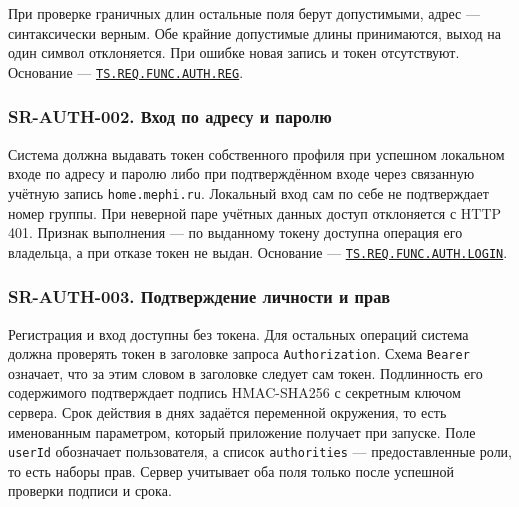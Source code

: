 \documentclass[12pt,a4paper]{article}
\begin{document}
При проверке граничных длин остальные поля берут допустимыми, адрес --- синтаксически верным. Обе крайние допустимые длины принимаются, выход на один символ отклоняется. При ошибке новая запись и токен отсутствуют. Основание --- {\href{../02\_Техническое\_задание/DOC-02\_Техническое\_задание.pdf\#ts-req-func-auth-reg}{\texttt{TS.\allowbreak{}REQ.\allowbreak{}FUNC.\allowbreak{}AUTH.\allowbreak{}REG}}}.

\subsubsection{SR-AUTH-002. Вход по адресу и паролю}\label{sr-auth-002-ux432ux445ux43eux434-ux43fux43e-ux430ux434ux440ux435ux441ux443-ux438-ux43fux430ux440ux43eux43bux44e}

\hypertarget{sr-auth-002-вход-по-адресу-и-паролю}{}

\hypertarget{sr-auth-002}{}

Система должна выдавать токен собственного профиля при успешном локальном входе по адресу и паролю либо при подтверждённом входе через связанную учётную запись \texttt{home.\allowbreak{}mephi.\allowbreak{}ru}. Локальный вход сам по себе не подтверждает номер группы. При неверной паре учётных данных доступ отклоняется с HTTP 401. Признак выполнения --- по выданному токену доступна операция его владельца, а при отказе токен не выдан. Основание --- {\href{../02\_Техническое\_задание/DOC-02\_Техническое\_задание.pdf\#ts-req-func-auth-login}{\texttt{TS.\allowbreak{}REQ.\allowbreak{}FUNC.\allowbreak{}AUTH.\allowbreak{}LOGIN}}}.

\subsubsection{SR-AUTH-003. Подтверждение личности и прав}\label{sr-auth-003-ux43fux43eux434ux442ux432ux435ux440ux436ux434ux435ux43dux438ux435-ux43bux438ux447ux43dux43eux441ux442ux438-ux438-ux43fux440ux430ux432}

\hypertarget{sr-auth-003-подтверждение-личности-и-прав}{}

\hypertarget{sr-auth-003}{}

Регистрация и вход доступны без токена. Для остальных операций система должна проверять токен в заголовке запроса \texttt{Authorization}. Схема \texttt{Bearer} означает, что за этим словом в заголовке следует сам токен. Подлинность его содержимого подтверждает подпись HMAC-SHA256 с секретным ключом сервера. Срок действия в днях задаётся переменной окружения, то есть именованным параметром, который приложение получает при запуске. Поле \texttt{userId} обозначает пользователя, а список \texttt{authorities} --- предоставленные роли, то есть наборы прав. Сервер учитывает оба поля только после успешной проверки подписи и срока.
\end{document}
